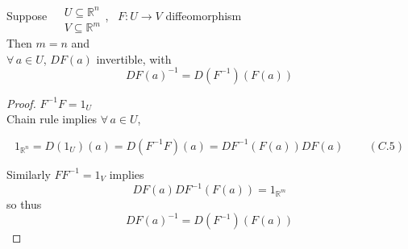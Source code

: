 \begin{proposition}[C.4] Suppose $\begin{aligned}
    & \quad \\ 
    & U \subseteq \mathbb{R}^n \\
    & V\subseteq \mathbb{R}^m \end{aligned}$, \quad \, $F: U \to V$ diffeomorphism \\
Then $m=n$ and \\
\phantom{ \quad } $\forall \, a \in U$, $DF(a)$ invertible, with 
\[
DF(a)^{-1} = D(F^{-1})(F(a))
\]
\end{proposition}

\begin{proof}
$F^{-1}F = 1_U$  \\
Chain rule implies $\forall \, a \in U$, 

\begin{equation}
  1_{\mathbb{R}^n} = D(1_U)(a) = D(F^{-1}F)(a) = DF^{-1}(F(a))DF(a) \quad \quad \, (C.5)
\end{equation}

Similarly $FF^{-1}=1_V$ implies
\[
DF(a)DF^{-1}(F(a)) = 1_{\mathbb{R}^m}
\]
so thus
\[
DF(a)^{-1}=D(F^{-1})(F(a))
\]
\end{proof}


